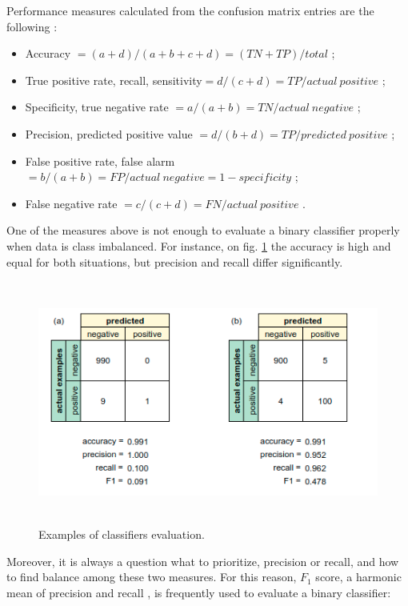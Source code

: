 Performance measures calculated from the confusion matrix entries are
the following \citep{Sebastiani2002}:
\begin{itemize}
    \item Accuracy $= (a + d)/(a + b + c + d) =
    (TN + TP)/total$ ;
    \item True positive rate, recall, sensitivity$ =
    d/(c + d) = TP/actual\: positive$ ;
    \item Specificity, true negative rate $= a/(a + b) =
    TN/actual\: negative$ ; 
    \item Precision, predicted positive value $=
    d/(b + d) = TP/predicted\: positive$ ;
    \item False positive rate, false alarm $= b/(a + b)
    = FP/actual\: negative = 1 - specificity$ ;
    \item False negative rate $= c/(c + d) = FN/actual\: positive$ .
\end{itemize}

One of the measures above is not enough to evaluate a binary classifier properly when data is class imbalanced. For instance, on fig. \ref{fig:classifiers-evaluation} the accuracy is high and equal for both situations, but precision and recall differ significantly. 

\begin{figure}[h]
    \centering
    \includegraphics[height=8cm]{Images/Classifiers-evaluation.png}
    \caption{Examples of classifiers evaluation.}
    \label{fig:classifiers-evaluation}
\end{figure}

Moreover, it is always a question what to prioritize, precision or recall, and how to find balance among these two measures. For this reason, $F_1$ score, a harmonic mean of precision and recall \citep{Chinchor-1992}, is frequently used to evaluate a binary classifier:

